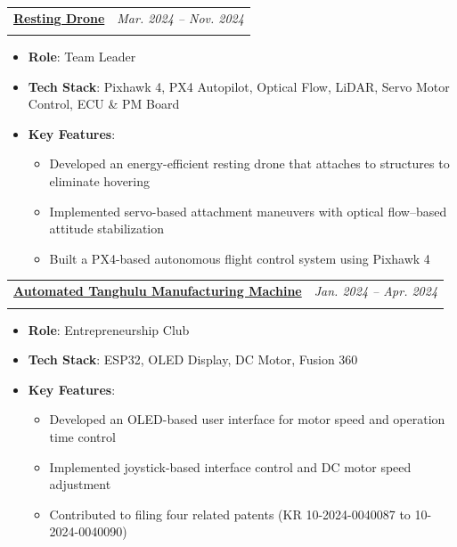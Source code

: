 \documentclass[a4paper,11pt]{article}
\makeatletter
\newcommand{\resumeProject}[4]{%
\item
    \begin{tabular*}{0.98\textwidth}[t]{l@{\extracolsep{\fill}}r}
        \textbf{#1} & \textit{\footnotesize{#3}} \\
        \footnotesize{\textit{#2}} & \footnotesize{#4}
    \end{tabular*}
}
\newcommand{\resumeItemListStart}{\begin{itemize}}
\newcommand{\resumeItemListEnd}{\end{itemize}}
\makeatother
\begin{document}
\vspace{0.5em}

\resumeProject
{\href{https://www.youtube.com/watch?v=_1o2Oad9vVQ}{Resting Drone}}
{}
{Mar. 2024 -- Nov. 2024}
{}
\vspace{-1.5em}
\resumeItemListStart
  \item \textbf{Role}: Team Leader
  \item \textbf{Tech Stack}: Pixhawk 4, PX4 Autopilot, Optical Flow, LiDAR, Servo Motor Control, ECU \& PM Board
  \item \textbf{Key Features}:
  \begin{itemize}[leftmargin=1.2em]
    \item Developed an energy-efficient resting drone that attaches to structures to eliminate hovering
    \item Implemented servo-based attachment maneuvers with optical flow--based attitude stabilization
    \item Built a PX4-based autonomous flight control system using Pixhawk 4
  \end{itemize}
\resumeItemListEnd

\vspace{0.5em}

\resumeProject
{\href{https://youtu.be/RuwLuphqz50}{Automated Tanghulu Manufacturing Machine}}
{}
{Jan. 2024 -- Apr. 2024}
{}
\vspace{-1.5em}
\resumeItemListStart
  \item \textbf{Role}: Entrepreneurship Club
  \item \textbf{Tech Stack}: ESP32, OLED Display, DC Motor, Fusion 360
  \item \textbf{Key Features}:
  \begin{itemize}[leftmargin=1.2em]
    \item Developed an OLED-based user interface for motor speed and operation time control
    \item Implemented joystick-based interface control and DC motor speed adjustment
    \item Contributed to filing four related patents (KR 10-2024-0040087 to 10-2024-0040090)
  \end{itemize}
\resumeItemListEnd
\end{document}
